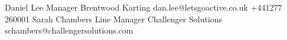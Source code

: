\smallskip\smallskip
\begin{referees}
		{Daniel Lee}
		{Manager}
		{Brentwood Karting}
		{dan.lee@letsgoactive.co.uk}
		{+441277 260001}{}
		{Sarah Chambers}
		{Line Manager}
		{Challenger Solutions}
		{schambers@challengersolutions.com}
		{}{}
\end{referees}
